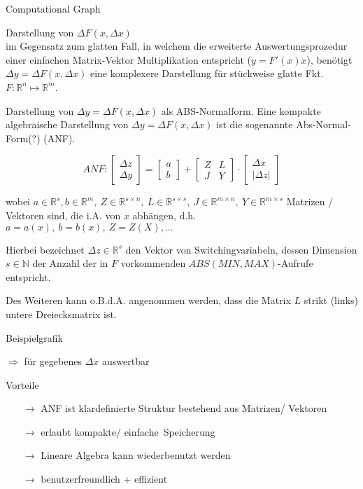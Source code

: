 \noindent
Computational Graph\\
\vspace{3cm}

\noindent
Darstellung von $\Delta F(x, \Delta x)$\\
im Gegensatz zum glatten Fall, in welchem die erweiterte Auswertungsprozedur einer einfachen Matrix-Vektor Multiplikation entspricht ($\dot{y}=F'(x)\dot{x}$), benötigt $\Delta y = \Delta F(x, \Delta x)$ eine komplexere Darstellung für stückweise glatte Fkt. $F: \mathbb{R}^n\mapsto \mathbb{R}^m$.

Darstellung von $\Delta y = \Delta F(x, \Delta x)$ als ABS-Normalform.
Eine kompakte algebraische Darstellung von $\Delta y = \Delta F(x, \Delta x)$ ist die sogenannte Abs-Normal-Form(?) (ANF).

$$ ANF: \begin{bmatrix}
\Delta z \\
\Delta y
\end{bmatrix}
=
\begin{bmatrix}
a \\b 
\end{bmatrix}
+
\begin{bmatrix}
Z & L \\
J & Y
\end{bmatrix}
\cdot
\begin{bmatrix}
\Delta x\\
|\Delta z|
\end{bmatrix}
$$

wobei $a \in \mathbb{R}^s, b \in \mathbb{R}^m,\ Z \in \mathbb{R}^{s \times n},\ L \in \mathbb{R}^{s \times s},\ J  \in \mathbb{R}^{m \times n},\ Y \in \mathbb{R}^{m\times s}$ Matrizen / Vektoren sind, die i.A. von $x$ abhängen, d.h. $a= a(x),\ b=b(x),\ Z=Z(X),\dots$

Hierbei bezeichnet $\Delta z  \in \mathbb{R}^s$ den Vektor von Switchingvariabeln, dessen Dimension $s \in \mathbb{N}$ der Anzahl der in $F$ vorkommenden $ABS (MIN,MAX)$-Aufrufe entspricht.

Des Weiteren kann o.B.d.A. angenommen werden, dass die Matrix $L$ strikt (links) untere Dreiecksmatrix ist.

Beispielgrafik
\vspace{3cm}

\noindent
$\Rightarrow$ für gegebenes $\Delta x$ auswertbar

Vorteile
\begin{itemize}
	\item[$\rightarrow$] ANF ist klardefinierte Struktur bestehend aus Matrizen/ Vektoren
	\item[$\rightarrow$] erlaubt \glqq kompakte/ einfache\grqq\ Speicherung
	\item[$\rightarrow$] Lineare Algebra kann wiederbenutzt werden
	\item[$\rightarrow$] benutzerfreundlich + effizient
\end{itemize}

